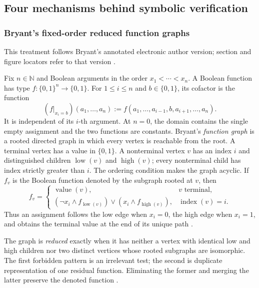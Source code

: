 
\subsection{Four mechanisms behind symbolic verification}
\label{sec:p09-presentation-n-c-017}

\subsubsection{Bryant's fixed-order reduced function graphs}
\label{sec:p09-n-c-017-bryant}

This treatment follows Bryant's annotated electronic author version;
section and figure locators refer to that version \cite{Bryant1986}.

Fix \(n\in\mathbb N\) and Boolean arguments in the order
\(x_1<\cdots<x_n\). A Boolean function has type
\(f:\{0,1\}^n\to\{0,1\}\). For \(1\leq i\leq n\) and
\(b\in\{0,1\}\), its cofactor is the function
\[
 (f|_{x_i=b})(a_1,\ldots,a_n)
 :=f(a_1,\ldots,a_{i-1},b,a_{i+1},\ldots,a_n).
\]
It is independent of its \(i\)-th argument. At \(n=0\), the domain contains
the single empty assignment and the two functions are constants.
Bryant's
\emph{function graph} is a rooted directed graph in which every vertex is
reachable from the root.  A terminal vertex has a value in \(\{0,1\}\).  A
nonterminal vertex \(v\) has an index \(i\) and distinguished children
\(\operatorname{low}(v)\) and \(\operatorname{high}(v)\); every nonterminal
child has index strictly greater than \(i\).  The ordering condition makes the
graph acyclic.  If \(f_v\) is the Boolean function denoted by the subgraph
rooted at \(v\), then
\[
 f_v=
 \begin{cases}
  \operatorname{value}(v),&v\text{ terminal},\\
  (\neg x_i\land f_{\operatorname{low}(v)})
   \lor(x_i\land f_{\operatorname{high}(v)}),
   &\operatorname{index}(v)=i.
 \end{cases}
\]
Thus an assignment follows the low edge when \(x_i=0\), the high edge when
\(x_i=1\), and obtains the terminal value at the end of its unique path
\cite[defs.~1--2]{Bryant1986}.

The graph is \emph{reduced} exactly when it has neither a vertex with identical
low and high children nor two distinct vertices whose rooted subgraphs are
isomorphic.  The first forbidden pattern is an irrelevant test; the second is
duplicate representation of one residual function.  Eliminating the former
and merging the latter preserve the denoted function
\cite[defs.~3--5]{Bryant1986}.

